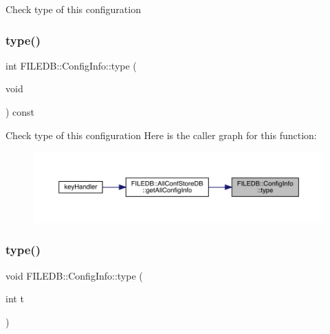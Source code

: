 Check type of this configuration \mbox{\label{classFILEDB_1_1ConfigInfo_a8053fc6dd889fb1e7c888359412fc0c7}} 
\subsubsection{\texorpdfstring{type()}{type()}\hspace{0.1cm}{\footnotesize\ttfamily [3/6]}}
{\footnotesize\ttfamily int F\+I\+L\+E\+D\+B\+::\+Config\+Info\+::type (\begin{DoxyParamCaption}\item[{void}]{ }\end{DoxyParamCaption}) const}

Check type of this configuration Here is the caller graph for this function\+:
\nopagebreak
\begin{figure}[H]
\begin{center}
\leavevmode
\includegraphics[width=350pt]{d0/d90/classFILEDB_1_1ConfigInfo_a8053fc6dd889fb1e7c888359412fc0c7_icgraph}
\end{center}
\end{figure}
\mbox{\label{classFILEDB_1_1ConfigInfo_a8d65b3b00e90f7daa4ab65fae36ed024}} 
\subsubsection{\texorpdfstring{type()}{type()}\hspace{0.1cm}{\footnotesize\ttfamily [4/6]}}
{\footnotesize\ttfamily void F\+I\+L\+E\+D\+B\+::\+Config\+Info\+::type (\begin{DoxyParamCaption}\item[{int}]{t }\end{DoxyParamCaption})}

\mbox{\label{classFILEDB_1_1ConfigInfo_a8d65b3b00e90f7daa4ab65fae36ed024}} 
